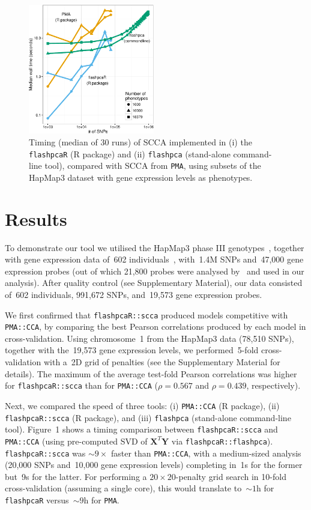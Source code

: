 \documentclass{bioinfo}
\begin{document}
\begin{figure}[!tpb]
\centerline{\includegraphics[width=0.49\textwidth]{scca_timing-crop.pdf}}
\caption{
Timing (median of 30 runs) of SCCA implemented in (i) the \texttt{flashpcaR}
(\textsf{R} package) and (ii) \texttt{flashpca} (stand-alone command-line tool),
compared with SCCA from \texttt{PMA}, using subsets of the HapMap3 dataset with gene
expression levels as phenotypes.
}
\label{fig:01}
\end{figure}

\section{Results}

To demonstrate our tool we utilised the HapMap3 phase III
genotypes~\citep{hapmap2010}, together with gene expression data of~602
individuals~\citep{Stranger2012}, with~1.4M SNPs and~47,000 gene expression
probes (out of which 21,800 probes were analysed by~\citet{Stranger2012} and
used in our analysis). After quality control (see Supplementary Material), our
data consisted of~602 individuals, 991,672 SNPs, and~19,573 gene expression
probes.

We first confirmed that \texttt{flashpcaR::scca} produced models competitive
with \texttt{PMA::CCA}, by comparing the best Pearson correlations produced by
each model in cross-validation.  Using chromosome~1 from the HapMap3 data
(78,510 SNPs), together with the~19,573 gene expression levels, we
performed~5-fold cross-validation with a~2D grid of penalties (see the
Supplementary Material for details). The maximum of the average test-fold
Pearson correlations was higher for \texttt{flashpcaR::scca} than for
\texttt{PMA::CCA} ($\rho=0.567$ and $\rho=0.439$, respectively).

Next, we compared the speed of three tools: (i) \texttt{PMA::CCA} (\textsf{R}
package), (ii) \texttt{flashpcaR::scca} (\textsf{R} package), and (iii)
\texttt{flashpca} (stand-alone command-line tool).
Figure~1\vphantom{\ref{fig:01}} shows a timing comparison between
\texttt{flashpcaR::scca} and \texttt{PMA::CCA} (using pre-computed SVD of
$\mathbf{X}^T \mathbf{Y}$ via \texttt{flashpcaR::flashpca}).
\texttt{flashpcaR::scca} was ${\sim}9\times$ faster than \texttt{PMA::CCA}, with
a medium-sized analysis (20,000 SNPs and~10,000 gene expression levels)
completing in~1s for the former but~9s for the latter.  For performing a
$20\times20$-penalty grid search in 10-fold cross-validation (assuming a single
core), this would translate to~${\sim}1$h for \texttt{flashpcaR}
versus~${\sim}9$h for \texttt{PMA}.
\end{document}
